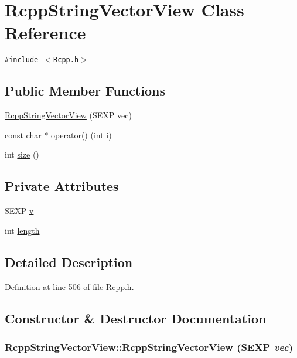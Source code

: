 \hypertarget{classRcppStringVectorView}{
\section{RcppStringVectorView Class Reference}
\label{classRcppStringVectorView}
}
{\tt \#include $<$Rcpp.h$>$}

\subsection*{Public Member Functions}
\begin{CompactItemize}
\item 
\hyperlink{classRcppStringVectorView_c74085bb16d7a13b58eb59f69268ec85}{RcppStringVectorView} (SEXP vec)
\item 
const char $\ast$ \hyperlink{classRcppStringVectorView_b81899b7d6c595f84d2fb07809ff002c}{operator()} (int i)
\item 
int \hyperlink{classRcppStringVectorView_df0f6b6541339ca747c4ed79c445869e}{size} ()
\end{CompactItemize}
\subsection*{Private Attributes}
\begin{CompactItemize}
\item 
SEXP \hyperlink{classRcppStringVectorView_1db3cc1a2dd1809151351c123343c15e}{v}
\item 
int \hyperlink{classRcppStringVectorView_ef6edaa52c234b4bb1fd1fc949fa0f25}{length}
\end{CompactItemize}


\subsection{Detailed Description}


Definition at line 506 of file Rcpp.h.

\subsection{Constructor \& Destructor Documentation}
\hypertarget{classRcppStringVectorView_c74085bb16d7a13b58eb59f69268ec85}{
\subsubsection[RcppStringVectorView]{\setlength{\rightskip}{0pt plus 5cm}RcppStringVectorView::RcppStringVectorView (SEXP {\em vec})}}
\label{classRcppStringVectorView_c74085bb16d7a13b58eb59f69268ec85}




